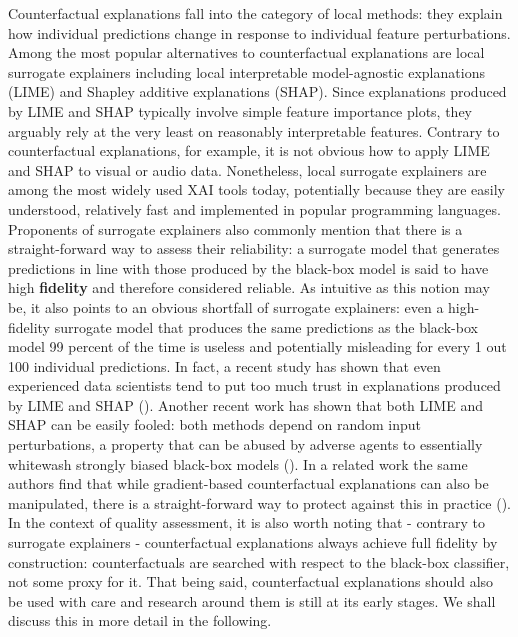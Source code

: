 \documentclass{juliacon}
\begin{document}
Counterfactual explanations fall into the category of local methods:
they explain how individual predictions change in response to individual
feature perturbations. Among the most popular alternatives to
counterfactual explanations are local surrogate explainers including
local interpretable model-agnostic explanations (LIME) and Shapley
additive explanations (SHAP). Since explanations produced by LIME and
SHAP typically involve simple feature importance plots, they arguably
rely at the very least on reasonably interpretable features. Contrary to
counterfactual explanations, for example, it is not obvious how to apply
LIME and SHAP to visual or audio data. Nonetheless, local surrogate
explainers are among the most widely used XAI tools today, potentially
because they are easily understood, relatively fast and implemented in
popular programming languages. Proponents of surrogate explainers also
commonly mention that there is a straight-forward way to assess their
reliability: a surrogate model that generates predictions in line with
those produced by the black-box model is said to have high
\textbf{fidelity} and therefore considered reliable. As intuitive as
this notion may be, it also points to an obvious shortfall of surrogate
explainers: even a high-fidelity surrogate model that produces the same
predictions as the black-box model 99 percent of the time is useless and
potentially misleading for every 1 out 100 individual predictions. In
fact, a recent study has shown that even experienced data scientists
tend to put too much trust in explanations produced by LIME and SHAP
(\cite{kaur2020interpreting}). Another recent work has shown that both
LIME and SHAP can be easily fooled: both methods depend on random input
perturbations, a property that can be abused by adverse agents to
essentially whitewash strongly biased black-box models
(\cite{slack2020fooling}). In a related work the same authors find that
while gradient-based counterfactual explanations can also be
manipulated, there is a straight-forward way to protect against this in
practice (\cite{slack2021counterfactual}). In the context of quality
assessment, it is also worth noting that - contrary to surrogate
explainers - counterfactual explanations always achieve full fidelity by
construction: counterfactuals are searched with respect to the black-box
classifier, not some proxy for it. That being said, counterfactual
explanations should also be used with care and research around them is
still at its early stages. We shall discuss this in more detail in the
following.
\end{document}
